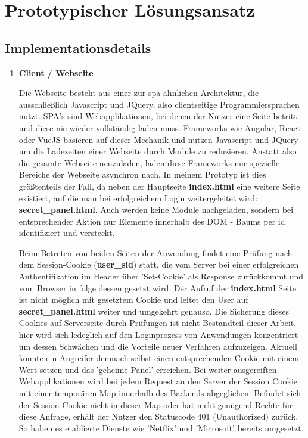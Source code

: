 \chapter{Prototypischer Lösungsansatz}
\section{Implementationsdetails}
\begin{enumerate} 
\item \textbf{Client / Webseite}

Die Webseite besteht aus einer zur \ac{spa} ähnlichen Architektur, die ausschließlich Javascript und JQuery, also clientseitige Programmiersprachen nutzt. SPA's sind Webapplikationen, bei denen der Nutzer eine Seite betritt und diese nie wieder vollständig laden muss. Frameworks wie Angular, React oder VueJS basieren auf dieser Mechanik und nutzen Javascript und JQuery um die Ladezeiten einer Webseite durch Module zu reduzieren. Anstatt also die gesamte Webseite neuzuladen, laden diese Frameworks nur spezielle Bereiche der Webseite asynchron nach. In meinem Prototyp ist dies größtenteils der Fall, da neben der Hauptseite \textbf{index.html} eine weitere Seite existiert, auf die man bei erfolgreichem Login weitergeleitet wird: \textbf{secret\_panel.html}. Auch werden keine Module nachgeladen, sondern bei entsprechender Aktion nur Elemente innerhalb des DOM - Baums per id identifiziert und versteckt.

Beim Betreten von beiden Seiten der Anwendung findet eine Prüfung nach dem Session-Cookie (\textbf{user\_sid}) statt, die vom Server bei einer erfolgreichen Authentifikation im Header über 'Set-Cookie' als Response zurückkommt und vom Browser in folge dessen gesetzt wird. Der Aufruf der \textbf{index.html} Seite ist nicht möglich mit gesetztem Cookie und leitet den User auf \textbf{secret\_panel.html} weiter und umgekehrt genauso. Die Sicherung dieses Cookies auf Serverseite durch Prüfungen ist nicht Bestandteil dieser Arbeit, hier wird sich ledeglich auf den Loginprozess von Anwendungen konzentriert um dessen Schwächen und die Vorteile neuer Verfahren aufzuzeigen. Aktuell könnte ein Angreifer demnach selbst einen entsprechenden Cookie mit einem Wert setzen und das 'geheime Panel' erreichen. Bei weiter ausgereiften Webapplikationen wird bei jedem Request an den Server der Session Cookie mit einer temporären Map innerhalb des Backends abgeglichen. Befindet sich der Session Cookie nicht in dieser Map oder hat nicht genügend Rechte für diese Anfrage, erhält der Nutzer den Statuscode 401 (Unauthorized) zurück. So haben es etablierte Dienste wie 'Netflix' und 'Microsoft' bereits umgesetzt.


\end{enumerate}
